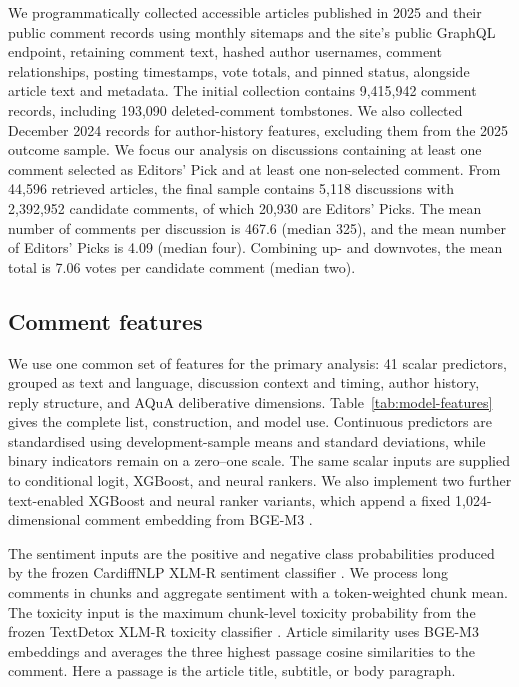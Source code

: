 We programmatically collected accessible articles published in 2025 and their public comment records using monthly sitemaps and the site's public GraphQL endpoint, retaining comment text, hashed author usernames, comment relationships, posting timestamps, vote totals, and pinned status, alongside article text and metadata. The initial collection contains 9,415,942 comment records, including 193,090 deleted-comment tombstones. We also collected December 2024 records for author-history features, excluding them from the 2025 outcome sample. We focus our analysis on discussions containing at least one comment selected as Editors' Pick and at least one non-selected comment. From 44,596 retrieved articles, the final sample contains 5,118 discussions with 2,392,952 candidate comments, of which 20,930 are Editors' Picks. The mean number of comments per discussion is 467.6 (median 325), and the mean number of Editors' Picks is 4.09 (median four). Combining up- and downvotes, the mean total is 7.06 votes per candidate comment (median two).

\subsection{Comment features}
We use one common set of features for the primary analysis: 41 scalar predictors, grouped as text and language, discussion context and timing, author history, reply structure, and AQuA deliberative dimensions. Table~\ref{tab:model-features} gives the complete list, construction, and model use. Continuous predictors are standardised using development-sample means and standard deviations, while binary indicators remain on a zero--one scale. The same scalar inputs are supplied to conditional logit, XGBoost, and neural rankers. We also implement two further text-enabled XGBoost and neural ranker variants, which append a fixed 1,024-dimensional comment embedding from BGE-M3 \citep{chen2024m3}.

The sentiment inputs are the positive and negative class probabilities produced by the frozen CardiffNLP XLM-R sentiment classifier \citep{cardiffnlp2022xlmr}. We process long comments in chunks and aggregate sentiment with a token-weighted chunk mean. The toxicity input is the maximum chunk-level toxicity probability from the frozen TextDetox XLM-R toxicity classifier \citep{textdetox2024xlmr}. Article similarity uses BGE-M3 embeddings \citep{chen2024m3} and averages the three highest passage cosine similarities to the comment. Here a passage is the article title, subtitle, or body paragraph.

